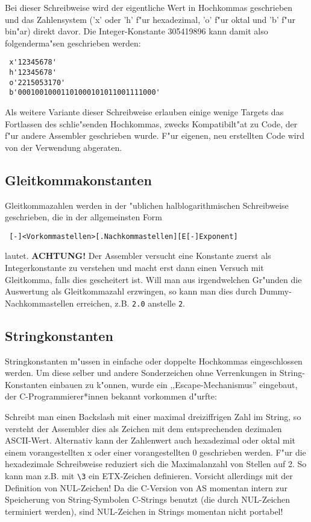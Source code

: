 \documentclass[12pt,a4paper,twoside]{report}
\newcommand{\bb}[1]{{\bf #1}}
\newcommand{\tty}[1]{{\tt #1}}
\begin{document}
Bei dieser Schreibweise wird der eigentliche Wert in Hochkommas geschrieben
und das Zahlensystem ('x' oder 'h' f"ur hexadezimal, 'o' f"ur oktal und 'b'
f"ur bin"ar) direkt davor.  Die Integer-Konstante 305419896 kann damit
also folgenderma"sen geschrieben werden:
\begin{verbatim}
 x'12345678'
 h'12345678'
 o'2215053170'
 b'00010010001101000101011001111000'
\end{verbatim}
Als weitere Variante dieser Schreibweise erlauben einige wenige Targets
das Fortlassen des schlie"senden Hochkommas, zwecks Kompatibilt"at zu
Code, der f"ur andere Assembler geschrieben wurde.  F"ur eigenen, neu
erstellten Code wird von der Verwendung abgeraten.

\subsection{Gleitkommakonstanten}

Gleitkommazahlen werden in der "ublichen halblogarithmischen
Schreibweise geschrieben, die in der allgemeinsten Form
\begin{verbatim}
 [-]<Vorkommastellen>[.Nachkommastellen][E[-]Exponent]
\end{verbatim}
lautet. \bb{ACHTUNG!} Der Assembler versucht eine Konstante zuerst als
Integerkonstante zu verstehen und macht erst dann einen Versuch mit
Gleitkomma, falls dies gescheitert ist.  Will man aus irgendwelchen
Gr"unden die Auswertung als Gleitkommazahl erzwingen, so kann man
dies durch Dummy-Nachkommastellen erreichen, z.B. \tty{2.0} anstelle
\tty{2}.

\subsection{Stringkonstanten}
\label{SectStringConsts}

Stringkonstanten m"ussen in einfache oder doppelte Hochkommas
eingeschlossen werden.  Um diese selber und andere Sonderzeichen ohne
Verrenkungen in String-Konstanten einbauen zu k"onnen, wurde ein
,,Escape-Mechanismus'' eingebaut, der C-Programmierer*innen bekannt
vorkommen d"urfte:

Schreibt man einen Backslash mit einer maximal dreiziffrigen Zahl im
String, so versteht der Assembler dies als Zeichen mit dem entsprechenden
dezimalen ASCII-Wert.  Alternativ kann der Zahlenwert auch hexadezimal
oder oktal mit einem vorangestellten x oder einer vorangestellten 0
geschrieben werden.  F"ur die hexadezimale Schreibweise reduziert sich die
Maximalanzahl von Stellen auf 2.  So kann man z.B. mit {\tt\verb!\3!} ein
ETX-Zeichen definieren.  Vorsicht allerdings mit der Definition von
NUL-Zeichen!  Da die C-Version  von AS momentan
intern zur Speicherung von String-Symbolen C-Strings benutzt (die durch
NUL-Zeichen terminiert werden), sind NUL-Zeichen in Strings momentan nicht
portabel!
\end{document}
